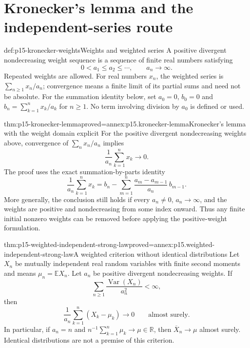 \section{Kronecker's lemma and the independent-series route}
\label{sec:p15-kronecker-strong-law}

\begin{hbdefinition}{def:p15-kronecker-weights}{Weights and weighted series}
A positive divergent nondecreasing weight sequence is a sequence of
finite real numbers satisfying
\[
 0<a_1\leq a_2\leq\cdots,\qquad a_n\longrightarrow\infty.
\]
Repeated weights are allowed. For real numbers \(x_n\), the weighted
series is \(\sum_{n\geq1}x_n/a_n\); convergence means a finite
limit of its partial sums and need not be absolute. For the summation
identity below, set \(a_0=0\), \(b_0=0\) and
\(b_n=\sum_{k=1}^nx_k/a_k\) for \(n\geq1\). No term involving
division by \(a_0\) is defined or used.
\end{hbdefinition}

\begin{hbtheorem}{thm:p15-kronecker-lemma}{proved=annex:p15.kronecker-lemma}{Kronecker's lemma with the weight domain explicit}
For the positive divergent nondecreasing weights above, convergence of
\(\sum_nx_n/a_n\) implies
\[
 \frac1{a_n}\sum_{k=1}^nx_k\longrightarrow0.
\]
The proof uses the exact summation-by-parts identity
\[
 \frac1{a_n}\sum_{k=1}^nx_k
   =b_n-\sum_{m=1}^n\frac{a_m-a_{m-1}}{a_n}\,b_{m-1}.
\]
More generally, the conclusion still holds if every \(a_n\ne0\),
\(a_n\to\infty\), and the weights are positive and nondecreasing
from some index onward. Thus any finite initial nonzero weights can be
removed before applying the positive-weight formulation.
\end{hbtheorem}

\begin{hbcorollary}{thm:p15-weighted-independent-strong-law}{proved=annex:p15.weighted-independent-strong-law}{A weighted criterion without identical distributions}
Let \(X_n\) be mutually independent real random variables with finite
second moments and means \(\mu_n=\mathbb EX_n\). Let \(a_n\)
be positive divergent nondecreasing weights. If
\[
 \sum_{n\geq1}\frac{\operatorname{Var}(X_n)}{a_n^2}<\infty,
\]
then
\[
 \frac1{a_n}\sum_{k=1}^n(X_k-\mu_k)\longrightarrow0
                                      \qquad\text{almost surely}.
\]
In particular, if \(a_n=n\) and
\(n^{-1}\sum_{k=1}^n\mu_k\to\mu\in\mathbb R\), then
\(\overline X_n\to\mu\) almost surely. Identical distributions
are not a premise of this criterion.
\end{hbcorollary}

